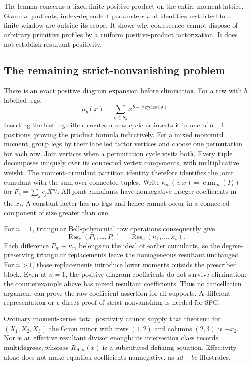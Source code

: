 \documentclass[11pt]{article}
\begin{document}
The lemma concerns a fixed finite positive product on the entire
moment lattice. Gamma quotients, index-dependent parameters and
identities restricted to a finite window are outside its scope.
It shows why coalescence cannot dispose of arbitrary primitive
profiles by a uniform positive-product factorization. It does not
establish resultant positivity.

\subsection{The remaining strict-nonvanishing problem}

There is an exact positive diagram expansion before elimination.
For a row with $b$ labelled legs,
\[
 \mu_b(x)=\sum_{\sigma\in S_b}x^{\,b-\#\mathrm{cycles}(\sigma)}.
\]
Inserting the last leg either creates a new cycle or inserts it in
one of $b-1$ positions, proving the product formula inductively.
For a mixed monomial moment, group legs by their labelled factor
vertices and choose one permutation for each row. Join vertices
when a permutation cycle visits both. Every tuple decomposes uniquely
over its connected vertex components, with multiplicative weight.
The moment--cumulant partition identity therefore identifies the joint
cumulant with the sum over connected tuples. Write
$\kappa_m(c;x)=\operatorname{cum}_m(F_c)$ for
$F_c=\sum_jc_jX^{a_j}$. All joint cumulants have
nonnegative integer coefficients in the $x_i$. A constant factor has
no legs and hence cannot occur in a connected component of size
greater than one.

For $n=1$, triangular Bell-polynomial row operations consequently give
\[
 \operatorname{Res}_c(P_1,\ldots,P_s)
       =\operatorname{Res}_c(\kappa_1,\ldots,\kappa_s).
\]
Each difference $P_m-\kappa_m$ belongs to the ideal of earlier
cumulants, so the degree-preserving triangular replacements leave the
homogeneous resultant unchanged. For $n>1$, those replacements introduce
lower moments outside the prescribed block. Even at $n=1$, the
positive diagram coefficients do not survive elimination:
the counterexample above has mixed resultant coefficients.
Thus no cancellation argument can prove the raw coefficient assertion
for all supports. A different representation or a direct proof of
strict nonvanishing is needed for SFC.

Ordinary moment-kernel total positivity cannot supply that theorem:
for $(X_1,X_2,X_3)$ the Gram minor with rows $(1,2)$ and columns $(2,3)$
is $-x_2$. Nor is an effective resultant divisor enough: its
intersection class records multidegrees, whereas $R_{A,n}(x)$ is a
substituted defining equation. Effectivity alone does not make equation
coefficients nonnegative, as $ad-bc$ illustrates.
\end{document}
